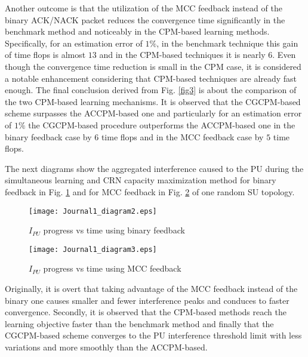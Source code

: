 \documentclass[journal]{IEEEtran}
\begin{document}
Another outcome is that the utilization of the MCC feedback instead of the binary ACK/NACK packet reduces the convergence time significantly in the benchmark method and noticeably in the CPM-based learning methods. Specifically, for an estimation error of $1\%$, in the benchmark technique this gain of time flops is almost $13$ and in the CPM-based techniques it is nearly $6$. Even though the convergence time reduction is small in the CPM case, it is considered a notable enhancement considering that CPM-based techniques are already fast enough. The final conclusion derived from Fig. \ref{fig3} is about the comparison of the two CPM-based learning mechanisms. It is observed that the CGCPM-based scheme surpasses the ACCPM-based one and particularly for an estimation error of $1\%$ the CGCPM-based procedure outperforms the ACCPM-based one in the binary feedback case by $6$ time flops and in the MCC feedback case by $5$ time flops.

The next diagrams show the aggregated interference caused to the PU during the simultaneous learning and CRN capacity maximization method for binary feedback in Fig. \ref{fig4} and for MCC feedback in Fig. \ref{fig5} of one random SU topology.
\begin{figure}[!h]
\centering
\texttt{[image: Journal1\_diagram2.eps]}
\caption{$I_{PU}$ progress vs time using binary feedback}
\label{fig4}
\end{figure}
\begin{figure}[!h]
\centering
\texttt{[image: Journal1\_diagram3.eps]}
\caption{$I_{PU}$ progress vs time using MCC feedback}
\label{fig5}
\end{figure}
Originally, it is overt that taking advantage of the MCC feedback instead of the binary one causes smaller and fewer interference peaks and conduces to faster convergence. Secondly, it is observed that the CPM-based methods reach the learning objective faster than the benchmark method and finally that the CGCPM-based scheme converges to the PU interference threshold limit with less variations and more smoothly than the ACCPM-based.
\end{document}
